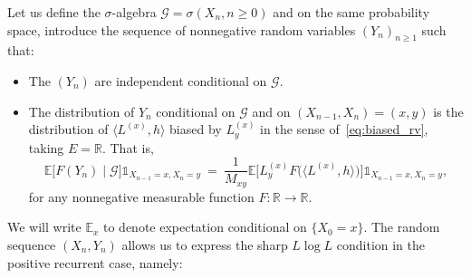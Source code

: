 \begin{refsegment}
Let us define the $\sigma$-algebra $\mathcal{G}=\sigma(X_n, n\geq 0)$ and on the same probability space, introduce the sequence of nonnegative random variables $(Y_n)_{n\geq 1}$ such that:
\begin{itemize}
  \item The $(Y_n)$ are independent conditional on $\mathcal{G}$.
  \item The distribution of $Y_n$ conditional on $\mathcal{G}$ and on
    $(X_{n-1}, X_{n})=(x,y)$ is the distribution of
    $\langle L^{(x)}, h\rangle$ biased by $L^{(x)}_y$ in the sense
    of~\eqref{eq:biased_rv}, taking $E=\mathbb{R}$. That is,
  \begin{equation}\label{eq:Yn_biased}
    \mathbb{E}\Big[F(Y_n) \mid \mathcal{G}\Big]\mathds{1}_{X_{n-1}=x, X_{n}=y}\ =\ \frac{1}{M_{xy}} \mathbb{E}\Big[L^{(x)}_y F\big(\langle L^{(x)},h\rangle\big)\Big] \mathds{1}_{X_{n-1}=x, X_{n}=y},
  \end{equation}
  for any nonnegative measurable function $F:\mathbb{R}\to \mathbb{R}$.
\end{itemize}
We will write $\mathbb{E}_x$ to denote expectation conditional on $\{X_0=x\}$.
The random sequence $(X_n,Y_n)$ allows us to express the sharp $L \log L$ condition in the positive recurrent case, namely:


\end{refsegment}
